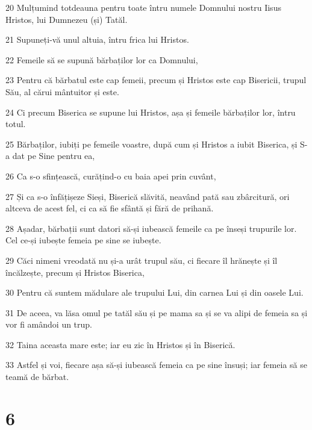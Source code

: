 \par 20 Mulțumind totdeauna pentru toate întru numele Domnului nostru Iisus Hristos, lui Dumnezeu (și) Tatăl.
\par 21 Supuneți-vă unul altuia, întru frica lui Hristos.
\par 22 Femeile să se supună bărbaților lor ca Domnului,
\par 23 Pentru că bărbatul este cap femeii, precum și Hristos este cap Bisericii, trupul Său, al cărui mântuitor și este.
\par 24 Ci precum Biserica se supune lui Hristos, așa și femeile bărbaților lor, întru totul.
\par 25 Bărbaților, iubiți pe femeile voastre, după cum și Hristos a iubit Biserica, și S-a dat pe Sine pentru ea,
\par 26 Ca s-o sfințească, curățind-o cu baia apei prin cuvânt,
\par 27 Și ca s-o înfățișeze Sieși, Biserică slăvită, neavând pată sau zbârcitură, ori altceva de acest fel, ci ca să fie sfântă și fără de prihană.
\par 28 Așadar, bărbații sunt datori să-și iubească femeile ca pe înseși trupurile lor. Cel ce-și iubește femeia pe sine se iubește.
\par 29 Căci nimeni vreodată nu și-a urât trupul său, ci fiecare îl hrănește și îl încălzește, precum și Hristos Biserica,
\par 30 Pentru că suntem mădulare ale trupului Lui, din carnea Lui și din oasele Lui.
\par 31 De aceea, va lăsa omul pe tatăl său și pe mama sa și se va alipi de femeia sa și vor fi amândoi un trup.
\par 32 Taina aceasta mare este; iar eu zic în Hristos și în Biserică.
\par 33 Astfel și voi, fiecare așa să-și iubească femeia ca pe sine însuși; iar femeia să se teamă de bărbat.

\chapter{6}

